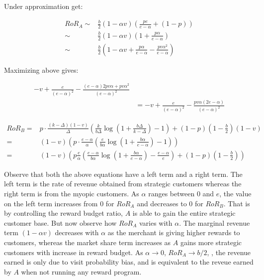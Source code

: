 Under approximation get:

\begin{align*}
RoR_A \sim & \frac{b}{2}(1-\alpha v)\left(\frac{pe}{e-\alpha} + (1-p)\right)\\
      \sim & \frac{b}{2}(1-\alpha v) \left(1 + \frac{p\alpha}{e-\alpha}\right)\\
       \sim & \frac{b}{2}\left(1-\alpha v + \frac{p\alpha}{e-\alpha} - \frac{pv\alpha^2}{e-\alpha}\right)
\end{align*}

Maximizing above gives:

\begin{align*}
-v + \frac{e}{(e-\alpha)^2} - \frac{(e-\alpha)2pv\alpha + pv\alpha^2}{(e-\alpha)^2}\\
&= -v + \frac{e}{(e-\alpha)^2} - \frac{pv\alpha(2e-\alpha)}{(e-\alpha)^2}
\end{align*}

\begin{align*}
RoR_B =& p\cdot\frac{(k-\Delta)(1-v)}{\Delta}\left(\frac{k}{b\Delta}\log\left(1+\frac{b\Delta}{k-\Delta}\right) - 1\right) + (1-p)(1-\frac{b}{2})(1-v)\\
      =& (1-v)\left(p\cdot\frac{e-\alpha}{\alpha}\left(\frac{e}{b\alpha}\log\left(1+\frac{b\alpha}{e-\alpha}\right) - 1\right)\right)\\
      =& (1-v)\left(p\frac{e}{\alpha}\left(\frac{e-\alpha}{b\alpha}\log\left(1+\frac{b\alpha}{e-\alpha}\right) - \frac{e-\alpha}{e}\right) + (1-p)(1-\frac{b}{2})\right)
\end{align*}

Observe that both the above equations have a left term and a right term. The left term is the rate of revenue obtained from strategic customers whereas the right term is from the myopic customers.
As $\alpha$ ranges between $0$ and $e$, the value on the left term increases from $0$ for $RoR_A$ and decreases to $0$ for $RoR_B$.
That is by controlling the reward budget ratio, $A$ is able to gain the entire strategic customer base.
But now observe how $RoR_A$ varies with $\alpha$.
The marginal revenue term $(1-\alpha v)$ decreases with $\alpha$ as the merchant is giving higher rewards to customers, whereas the market share term increases as $A$ gains more strategic customers with increase in reward budget.
As $\alpha \to 0$, $RoR_A \to b/2$, \ie, the revenue earned is only due to visit probability bias, and is equivalent to the reveue earned by $A$ when not running any reward program.

